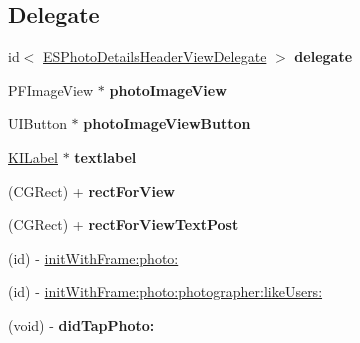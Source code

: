 \subsection*{Delegate}
\begin{DoxyCompactItemize}
\item 
\hypertarget{interface_e_s_photo_details_header_view_ad110cb87747aaf9ed8591ce512c1703b}{}id$<$ \hyperlink{protocol_e_s_photo_details_header_view_delegate-p}{E\+S\+Photo\+Details\+Header\+View\+Delegate} $>$ {\bfseries delegate}\label{interface_e_s_photo_details_header_view_ad110cb87747aaf9ed8591ce512c1703b}

\item 
\hypertarget{interface_e_s_photo_details_header_view_a17ac7acf844fc05a350029423a662f5a}{}P\+F\+Image\+View $\ast$ {\bfseries photo\+Image\+View}\label{interface_e_s_photo_details_header_view_a17ac7acf844fc05a350029423a662f5a}

\item 
\hypertarget{interface_e_s_photo_details_header_view_ac7110c928e81d07d01962bbfdf6c39f0}{}U\+I\+Button $\ast$ {\bfseries photo\+Image\+View\+Button}\label{interface_e_s_photo_details_header_view_ac7110c928e81d07d01962bbfdf6c39f0}

\item 
\hypertarget{interface_e_s_photo_details_header_view_aba67acce30b8b3d85c328f002d2c98ac}{}\hyperlink{interface_k_i_label}{K\+I\+Label} $\ast$ {\bfseries textlabel}\label{interface_e_s_photo_details_header_view_aba67acce30b8b3d85c328f002d2c98ac}

\item 
\hypertarget{interface_e_s_photo_details_header_view_a2e67fc3adef611f26fd1ef373ac7f0f1}{}(C\+G\+Rect) + {\bfseries rect\+For\+View}\label{interface_e_s_photo_details_header_view_a2e67fc3adef611f26fd1ef373ac7f0f1}

\item 
\hypertarget{interface_e_s_photo_details_header_view_a95c6490179de6dd443d465b55f59b1ff}{}(C\+G\+Rect) + {\bfseries rect\+For\+View\+Text\+Post}\label{interface_e_s_photo_details_header_view_a95c6490179de6dd443d465b55f59b1ff}

\item 
(id) -\/ \hyperlink{interface_e_s_photo_details_header_view_a5937118479372c8e73bb9d99baeb66d3}{init\+With\+Frame\+:photo\+:}
\item 
(id) -\/ \hyperlink{interface_e_s_photo_details_header_view_ad10e76324f01bf11128cd4e6677e7a9b}{init\+With\+Frame\+:photo\+:photographer\+:like\+Users\+:}
\item 
\hypertarget{interface_e_s_photo_details_header_view_a9389f6c65d925ce62ca97fd67ea069b6}{}(void) -\/ {\bfseries did\+Tap\+Photo\+:}\label{interface_e_s_photo_details_header_view_a9389f6c65d925ce62ca97fd67ea069b6}


\end{DoxyCompactItemize}
